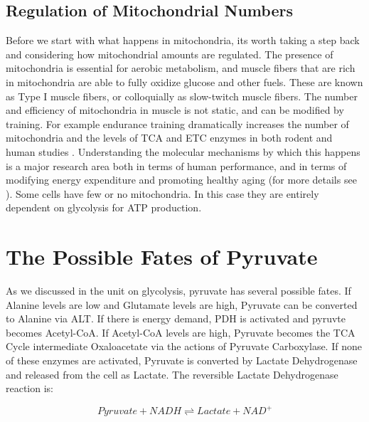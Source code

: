 \documentclass{tufte-handout}
\begin{document}
\subsection{Regulation of Mitochondrial Numbers}
Before we start with what happens in mitochondria, its worth taking a step back and considering how mitochondrial amounts are regulated.  The presence of mitochondria is essential for aerobic metabolism, and muscle fibers that are rich in mitochondria are able to fully oxidize glucose and other fuels.  These are known as Type I muscle fibers, or colloquially as slow-twitch muscle fibers.  The number and efficiency of mitochondria in muscle is not static, and can be modified by training.  For example endurance training dramatically increases the number of mitochondria and the levels of TCA and ETC enzymes in both rodent and human studies \citep{Holloszy1967,Gollnick1972,Gollnick1973}.  Understanding the molecular mechanisms by which this happens is a major research area both in terms of human performance, and in terms of modifying energy expenditure and promoting healthy aging (for more details see \citet{Cartee2016}).  Some cells have few or no mitochondria.  In this case they are entirely dependent on glycolysis for ATP production.

\section{The Possible Fates of Pyruvate}

As we discussed in the unit on glycolysis, pyruvate has several possible fates.  If Alanine levels are low and Glutamate levels are high, Pyruvate can be converted to Alanine via ALT.  If there is energy demand, PDH is activated and pyruvte becomes Acetyl-CoA.  If Acetyl-CoA levels are high, Pyruvate becomes the TCA Cycle intermediate Oxaloacetate via the actions of Pyruvate Carboxylase.  If none of these enzymes are activated, Pyruvate is converted by Lactate Dehydrogenase and released from the cell as Lactate.  The reversible Lactate Dehydrogenase reaction is:

\begin{equation}\label{eq:ldh}
Pyruvate + NADH \rightleftharpoons Lactate + NAD^+
\end{equation}
\end{document}
